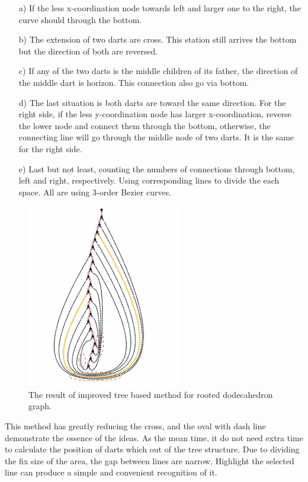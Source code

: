   \begin{itemize}
    \item[a)] If the less x-coordination node towards left and larger one to the right, the curve should through the bottom.
    \item[b)] The extension of two darts are cross. This station still arrives the bottom but the direction of both are reversed.
    \item[c)] If any of the two darts is the middle children of its father, the direction of the middle dart is horizon.  This connection also go via bottom.
    \item[d)] The last situation is both darts are toward the same direction. For the right side, if the less y-coordination node has larger x-coordination, reverse the lower node and connect them through the bottom, otherwise, the connecting line will go through the middle node of two darts. It is the same for the right side.
    \item[e)] Last but not least, counting the numbers of connections through bottom, left and right, respectively. Using corresponding lines to divide the each space. All are using 3-order Bezier curves.
  \end{itemize}

  \begin{figure}[htb]
    \centering
    \includegraphics[width=0.6\textwidth]{../../image/improvemap.png}
    \caption{The result of improved tree based method for rooted dodecahedron graph.}
    \label{fig:figures:improvemap}
  \end{figure}

  This method has greatly reducing the cross, and the oval with dash line demonstrate the essence of the ideas. As the mean time, it do not need extra time to calculate the position of darts which out of the tree structure. Due to dividing the fix size of the area, the gap between lines are narrow. Highlight the selected line can produce a simple and convenient recognition of it.

